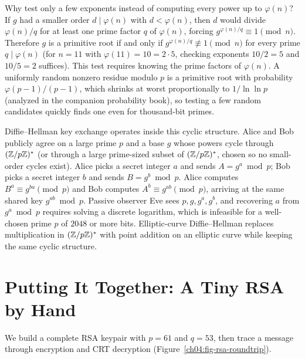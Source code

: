 \begin{connectionbox}
Why test only a few exponents instead of computing every power up to $\varphi(n)$? If $g$ had a
smaller order $d \mid \varphi(n)$ with $d < \varphi(n)$, then $d$ would divide $\varphi(n)/q$ for at
least one prime factor $q$ of $\varphi(n)$, forcing $g^{\varphi(n)/q} \equiv 1 \pmod n$. Therefore
$g$ is a primitive root if and only if $g^{\varphi(n)/q} \not\equiv 1 \pmod n$ for every prime
$q \mid \varphi(n)$ (for $n = 11$ with $\varphi(11) = 10 = 2 \cdot 5$, checking exponents $10/2 = 5$
and $10/5 = 2$ suffices). This test requires knowing the prime factors of $\varphi(n)$. A uniformly
random nonzero residue modulo $p$ is a primitive root with probability $\varphi(p-1)/(p-1)$, which
shrinks at worst proportionally to $1/\ln\ln p$ (analyzed in the companion probability book), so
testing a few random candidates quickly finds one even for thousand-bit primes.
\end{connectionbox}

\begin{applicationbox}
Diffie--Hellman key exchange operates inside this cyclic structure. Alice and Bob publicly agree on
a large prime $p$ and a base $g$ whose powers cycle through $(\mathbb{Z}/p\mathbb{Z})^{*}$ (or through a large
prime-sized subset of $(\mathbb{Z}/p\mathbb{Z})^{*}$, chosen so no small-order cycles exist). Alice picks a secret
integer $a$ and sends $A = g^a \bmod p$; Bob picks a secret integer $b$ and sends $B = g^b \bmod p$.
Alice computes $B^a \equiv g^{ba} \pmod p$ and Bob computes $A^b \equiv g^{ab} \pmod p$, arriving at
the same shared key $g^{ab} \bmod p$. Passive observer Eve sees $p, g, g^a, g^b$, and recovering
$a$ from $g^a \bmod p$ requires solving a discrete logarithm, which is infeasible for a well-chosen
prime $p$ of $2048$ or more bits. Elliptic-curve Diffie--Hellman replaces multiplication in
$(\mathbb{Z}/p\mathbb{Z})^{*}$ with point addition on an elliptic curve while keeping the same cyclic structure.
\end{applicationbox}

\section{Putting It Together: A Tiny RSA by Hand}
\label{ch04:rsa-toy}

We build a complete RSA keypair with $p = 61$ and $q = 53$, then trace a message through encryption
and CRT decryption (Figure~\ref{ch04:fig-rsa-roundtrip}).

